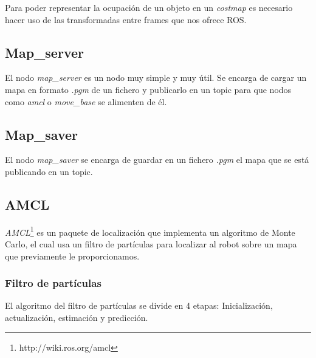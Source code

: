 Para poder representar la ocupación de un objeto en un \textit{costmap} es necesario hacer uso de las transformadas entre frames que nos ofrece ROS.

\subsection{Map\_server}
\label{sec:mapserver}
El nodo \textit{map\_server} es un nodo muy simple y muy útil. Se encarga de cargar un mapa en formato \textit{.pgm} de un fichero y publicarlo en un topic para que nodos como \textit{amcl} o \textit{move\_base} se alimenten de él.

\subsection{Map\_saver}
\label{sec:mapsaver}
El nodo \textit{map\_saver} se encarga de guardar en un fichero \textit{.pgm} el mapa que se está publicando en un topic.

\subsection{AMCL}
\label{sec:amcl}
\textit{AMCL}\footnote{http://wiki.ros.org/amcl} es un paquete de localización que implementa un algoritmo de Monte Carlo, el cual usa un filtro de partículas para localizar al robot sobre un mapa que previamente le proporcionamos.
\subsubsection{Filtro de partículas}

El algoritmo del filtro de partículas se divide en 4 etapas: Inicialización, actualización, estimación y predicción. 

